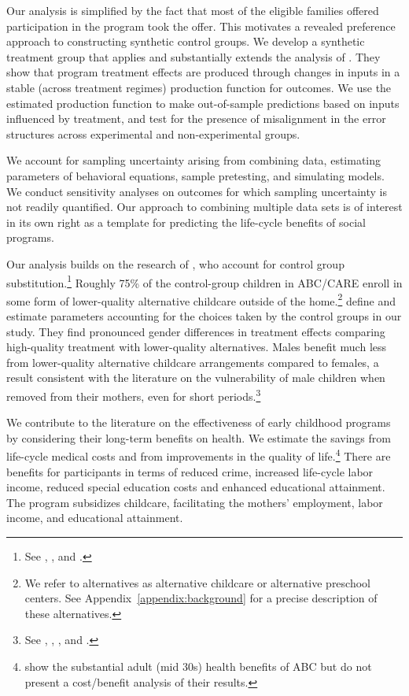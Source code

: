 Our analysis is simplified by the fact that most of the eligible families offered participation in the program took the offer. This motivates a revealed preference approach to constructing synthetic control groups. We develop a synthetic treatment group that applies and substantially extends the analysis of \citet{Heckman_Pinto_etal_2013_PerryFactor}. They show that program treatment effects are produced through changes in inputs in a stable (across treatment regimes) production function for outcomes. We use the estimated production function to make out-of-sample predictions based on inputs influenced by treatment, and test for the presence of misalignment in the error structures across experimental and non-experimental groups.

We account for sampling uncertainty arising from combining data, estimating parameters of behavioral equations, sample pretesting, and simulating models. We conduct sensitivity analyses on outcomes for which sampling uncertainty is not readily quantified. Our approach to combining multiple data sets is of interest in its own right as a template for predicting the life-cycle benefits of social programs.

Our analysis builds on the research of \cite{Garcia_Heckman_Ziff_2017_Gender-Diff_UNPUBLISHED}, who account for control group substitution.\footnote{See \cite{Heckman_1992_randomization}, \cite{Heckman_Hohmann_etal_2000_QJE}, and \cite{Kline_Walters_2016_QJE}.} Roughly 75\% of the control-group children in ABC/CARE enroll in some form of lower-quality alternative childcare outside of the home.\footnote{We refer to alternatives as alternative childcare or alternative preschool centers. See  Appendix~\ref{appendix:background} for a precise description of these alternatives.} \citet{Garcia_Heckman_Ziff_2017_Gender-Diff_UNPUBLISHED} define and estimate parameters accounting for the choices taken by the control groups in our study. They find pronounced gender differences in treatment effects comparing high-quality treatment with lower-quality alternatives. Males benefit much less from lower-quality alternative childcare arrangements compared to females, a result consistent with the literature on the vulnerability of male children when removed from their mothers, even for short periods.\footnote{See \citet{Kottelenberg-Lehrer_2014_Gender-Effects}, \citet{Baker_Gruber_Milligan_2015_Noncog_Defects}, \cite{Schore_2017_IMHJ}, and \cite{Garcia_Heckman_Ziff_2017_Gender-Diff_UNPUBLISHED}.}

We contribute to the literature on the effectiveness of early childhood programs by considering their long-term benefits on health. We estimate the savings from life-cycle medical costs and from improvements in the quality of life.\footnote{\cite{Campbell_Conti_etal_2014_EarlyChildhoodInvestments} show the substantial adult (mid 30s) health benefits of ABC but do not present a cost/benefit analysis of their results.} There are benefits for participants in terms of reduced crime, increased life-cycle labor income, reduced special education costs and enhanced educational attainment. The program subsidizes childcare, facilitating the mothers' employment, labor income, and educational attainment.

